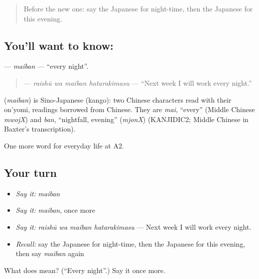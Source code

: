 \label{lesson:JA-C166-maiban}



\begin{quote}
Before the new one: say the Japanese for night-time, then the Japanese for this evening.
\end{quote}

\subsection*{You'll want to know: }
\textbf{} — \emph{maiban} — \textquotedblleft{}every night\textquotedblright{}.

\begin{quote}
\textbf{  } — \emph{raishū wa maiban hatarakimasu} — \textquotedblleft{}Next week I will work every night.\textquotedblright{}
\end{quote}

\begin{cousinweb}
\textbf{} (\emph{maiban}) is Sino-Japanese (kango): two Chinese characters read with their on'yomi, readings borrowed from Chinese. They are \emph{mai}, \textquotedblleft{}every\textquotedblright{} (Middle Chinese \emph{mwojX}) and \emph{ban}, \textquotedblleft{}nightfall, evening\textquotedblright{} (\emph{mjonX}) (KANJIDIC2; Middle Chinese in Baxter's transcription).
\end{cousinweb}

\begin{grammarlens}[title={What you've built}]
One more word for everyday life at A2.
\end{grammarlens}

\subsection*{Your turn}
\begin{itemize}
\raggedright
  \item \emph{Say it:} \emph{maiban}
  \item \emph{Say it:} \emph{maiban}, once more
  \item \emph{Say it:} \emph{raishū wa maiban hatarakimasu} — Next week I will work every night.
  \item \emph{Recall:} say the Japanese for night-time, then the Japanese for this evening, then say \emph{maiban} again
\end{itemize}

\begin{tcolorbox}[breakable,colback=teal!4,colframe=teal!35!black,title={Before you move on}]
What does  mean? (\textquotedblleft{}Every night\textquotedblright{}.) Say it once more.
\end{tcolorbox}
